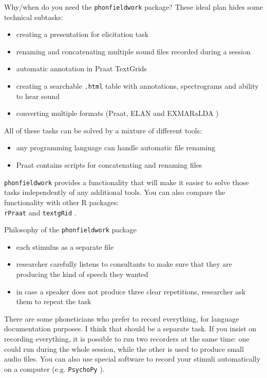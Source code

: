\documentclass[13pt, t]{beamer}
\begin{document}
\begin{frame}{Why/when do you need the \texttt{phonfieldwork} package?}
These ideal plan hides some technical subtasks:
\begin{itemize}
\item creating a presentation for elicitation task
\item renaming and concatenating multiple sound files recorded during a session
\item automatic annotation in Praat TextGrids {\small \citep{boersma19}}
\item creating a searchable \texttt{.html} table with annotations, spectrograms and ability to hear sound
\item converting multiple formats (Praat, ELAN \citep{brugman04} and EXMARaLDA \citep{schmidt09}) \pause
\end{itemize}
\vfill
All of these tasks can be solved by a mixture of different tools:
\begin{itemize}
\item any programming language can handle automatic  file renaming
\item Praat contains scripts for concatenating and renaming files
\end{itemize}
\pause
\vfill
\texttt{phonfieldwork} provides a functionality that will make it easier to solve those tasks independently of any additional tools. You can also compare the functionality with other R packages:\\ \texttt{rPraat} \citep{borzil16} and \texttt{textgRid} \citep{reidy16}.
\end{frame}

\begin{frame}{Philosophy of the \texttt{phonfieldwork} package}
\begin{itemize}
\item each stimulus as a separate file
\item researcher carefully listens to consultants to make sure that they are producing the kind of speech they wanted
\item in case a speaker does not produce three clear repetitions, researcher ask them to repeat the task
\end{itemize}

There are some phoneticians who prefer to record everything, for language documentation purposes. I think that should be a separate task. If you insist on recording everything, it is possible to run two recorders at the same time: one could run during the whole session, while the other is used to produce small audio files. You can also use special software to record your stimuli automatically on a computer (e.g. \texttt{PsychoPy} \citep{peirce19}).
\end{frame}
\end{document}
